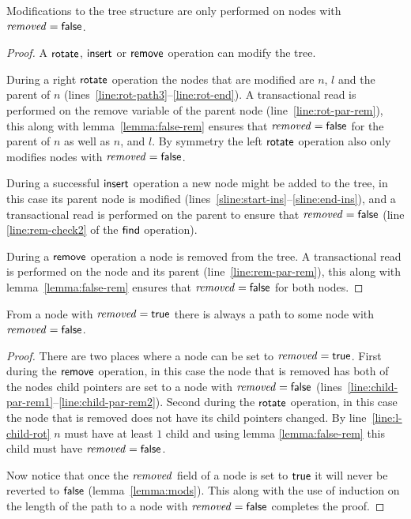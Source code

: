 \begin{lemma}
\label{lemma:mods}
Modifications to the tree structure are only performed on nodes with $\ms{removed}=\lit{false}$.
\end{lemma}
\begin{proof}
A $\act{rotate}$, $\act{insert}$ or $\act{remove}$ operation can modify the tree.

During a right $\act{rotate}$ operation the nodes that are modified are $n$, $l$ and the parent of $n$ (lines~\ref{line:rot-path3}--\ref{line:rot-end}).
A transactional read is performed on the remove variable of the parent node (line~\ref{line:rot-par-rem}), this along with lemma~\ref{lemma:false-rem} ensures 
that $\ms{removed}=\lit{false}$ for the parent of $n$ as well as $n$, and $l$.
By symmetry the left $\act{rotate}$ operation also only modifies nodes with $\ms{removed}=\lit{false}$.

During a successful $\act{insert}$ operation a new node might be added to the tree, in this case its parent node is modified (lines~\ref{sline:start-ins}--\ref{sline:end-ins}), and
a transactional read is performed on the parent to ensure that $\ms{removed}=\lit{false}$ (line \ref{line:rem-check2} of the $\act{find}$ operation).

During a $\act{remove}$ operation a node is removed from the tree.
A transactional read is performed on the node and its parent (line~\ref{line:rem-par-rem}), this along with lemma~\ref{lemma:false-rem} ensures that $\ms{removed}=\lit{false}$ for both nodes.
\end{proof}

\begin{lemma}
\label{lemma:path-false}
From a node with $\ms{removed}=\lit{true}$ there is always a path to some node with $\ms{removed}=\lit{false}$.
\end{lemma}
\begin{proof}
There are two places where a node can be set to $\ms{removed}=\lit{true}$.
First during the $\act{remove}$ operation, in this case the node that is removed has both of the nodes child pointers are set to a node
with $\ms{removed}=\lit{false}$ (lines~\ref{line:child-par-rem1}--\ref{line:child-par-rem2}).
Second during the $\act{rotate}$ operation, in this case the node that is removed does not have its child pointers changed.
By line~\ref{line:l-child-rot} $n$ must have at least $1$ child and using lemma \ref{lemma:false-rem} this child must have $\ms{removed}=\lit{false}$.

Now notice that once the $\ms{removed}$ field of a node is set to $\lit{true}$ it will never be reverted to $\lit{false}$ (lemma~\ref{lemma:mods}).
This along with the use of induction on the length
of the path to a node with $\ms{removed}=\lit{false}$ completes the proof.
\end{proof}


